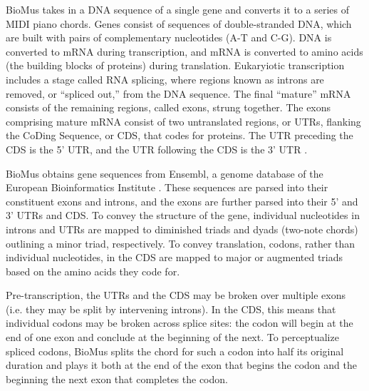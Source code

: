 \documentclass[letterpaper]{article}
\begin{document}
BioMus takes in a DNA sequence of a single gene and converts it to a series of MIDI piano chords. Genes consist of sequences of double-stranded DNA, which are built with pairs of complementary nucleotides (A-T and C-G). 
DNA is converted to mRNA during transcription, and mRNA is converted to amino acids (the building blocks of proteins) during translation. Eukaryiotic transcription includes a stage called RNA splicing, where regions known as introns are removed, or “spliced out,” from the DNA sequence. The final “mature” mRNA consists of the remaining regions, called exons, strung together. The exons comprising mature mRNA consist of two untranslated regions, or UTRs, flanking the CoDing Sequence, or CDS, that codes for proteins. 
The UTR preceding the CDS is the 5’ UTR, and the UTR following the CDS is the 3’ UTR \cite{clancy_2008,clancy_brown_2008}.

BioMus obtains gene sequences from Ensembl, a genome database of the European Bioinformatics Institute  \cite{birney_et_al_2004}. These sequences are parsed into their constituent exons and introns, and the exons are further parsed into their 5’ and 3’ UTRs and CDS. To convey the structure of the gene, individual nucleotides in introns and UTRs are mapped to diminished triads and dyads (two-note chords) outlining a minor triad, respectively. To convey translation, codons, rather than individual nucleotides, in the CDS are mapped to major or augmented triads based on the amino acids they code for.

Pre-transcription, the UTRs and the CDS may be broken over multiple exons (i.e. they may be split by intervening introns). In the CDS, this means that individual codons may be broken across splice sites: the codon will begin at the end of one exon and conclude at the beginning of the next. To perceptualize spliced codons, BioMus splits the chord for such a codon into half its original duration and plays it both at the end of the exon that begins the codon and the beginning the next exon that completes the codon. 
\end{document}
